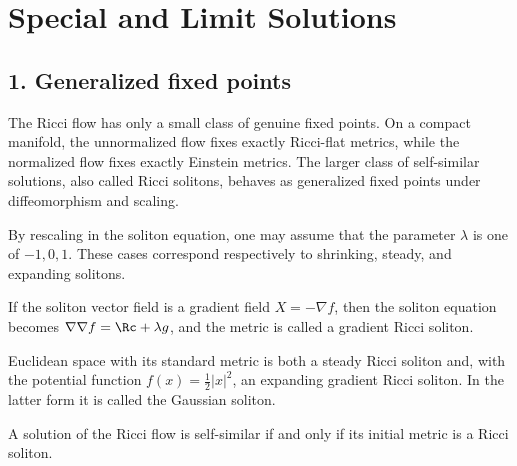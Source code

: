 \chapter{Special and Limit Solutions}

\section*{1. Generalized fixed points}

The Ricci flow has only a small class of genuine fixed points. On a compact
manifold, the unnormalized flow fixes exactly Ricci-flat metrics, while the
normalized flow fixes exactly Einstein metrics. The larger class of
self-similar solutions, also called Ricci solitons, behaves as generalized
fixed points under diffeomorphism and scaling.

\begin{remark}
\label{ch02-rem-self-similar-solutions}

By rescaling in the soliton equation, one may assume that the parameter
\(\lambda\) is one of \(-1,0,1\). These cases correspond respectively to
shrinking, steady, and expanding solitons.
\end{remark}

\begin{remark}
\label{ch02-rem-gradient-solitons}

If the soliton vector field is a gradient field \(X=-\nabla f\), then the
soliton equation becomes \(\nabla\nabla f=\Rc+\lambda g\), and the metric is
called a gradient Ricci soliton.
\end{remark}

\begin{example}
\label{ch02-ex-gaussian-soliton}

Euclidean space with its standard metric is both a steady Ricci soliton and,
with the potential function \(f(x)=\frac12|x|^2\), an expanding gradient Ricci
soliton. In the latter form it is called the Gaussian soliton.
\end{example}

\begin{lemma}
\label{ch02-lem-self-similar-solutions-and-solitons}

A solution of the Ricci flow is self-similar if and only if its initial metric
is a Ricci soliton.
\end{lemma}

